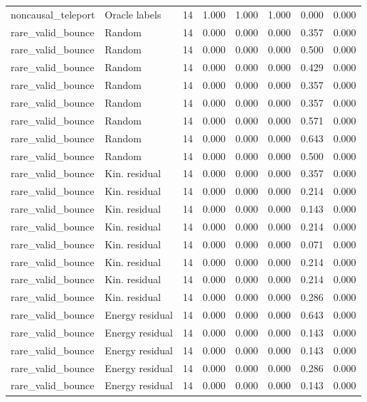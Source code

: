 {\begin{longtable}{llrrrrrr}
noncausal\_teleport & Oracle labels & 14 & 1.000 & 1.000 & 1.000 & 0.000 & 0.000 \\
rare\_valid\_bounce & Random & 14 & 0.000 & 0.000 & 0.000 & 0.357 & 0.000 \\
rare\_valid\_bounce & Random & 14 & 0.000 & 0.000 & 0.000 & 0.500 & 0.000 \\
rare\_valid\_bounce & Random & 14 & 0.000 & 0.000 & 0.000 & 0.429 & 0.000 \\
rare\_valid\_bounce & Random & 14 & 0.000 & 0.000 & 0.000 & 0.357 & 0.000 \\
rare\_valid\_bounce & Random & 14 & 0.000 & 0.000 & 0.000 & 0.357 & 0.000 \\
rare\_valid\_bounce & Random & 14 & 0.000 & 0.000 & 0.000 & 0.571 & 0.000 \\
rare\_valid\_bounce & Random & 14 & 0.000 & 0.000 & 0.000 & 0.643 & 0.000 \\
rare\_valid\_bounce & Random & 14 & 0.000 & 0.000 & 0.000 & 0.500 & 0.000 \\
rare\_valid\_bounce & Kin. residual & 14 & 0.000 & 0.000 & 0.000 & 0.357 & 0.000 \\
rare\_valid\_bounce & Kin. residual & 14 & 0.000 & 0.000 & 0.000 & 0.214 & 0.000 \\
rare\_valid\_bounce & Kin. residual & 14 & 0.000 & 0.000 & 0.000 & 0.143 & 0.000 \\
rare\_valid\_bounce & Kin. residual & 14 & 0.000 & 0.000 & 0.000 & 0.214 & 0.000 \\
rare\_valid\_bounce & Kin. residual & 14 & 0.000 & 0.000 & 0.000 & 0.071 & 0.000 \\
rare\_valid\_bounce & Kin. residual & 14 & 0.000 & 0.000 & 0.000 & 0.214 & 0.000 \\
rare\_valid\_bounce & Kin. residual & 14 & 0.000 & 0.000 & 0.000 & 0.214 & 0.000 \\
rare\_valid\_bounce & Kin. residual & 14 & 0.000 & 0.000 & 0.000 & 0.286 & 0.000 \\
rare\_valid\_bounce & Energy residual & 14 & 0.000 & 0.000 & 0.000 & 0.643 & 0.000 \\
rare\_valid\_bounce & Energy residual & 14 & 0.000 & 0.000 & 0.000 & 0.143 & 0.000 \\
rare\_valid\_bounce & Energy residual & 14 & 0.000 & 0.000 & 0.000 & 0.143 & 0.000 \\
rare\_valid\_bounce & Energy residual & 14 & 0.000 & 0.000 & 0.000 & 0.286 & 0.000 \\
rare\_valid\_bounce & Energy residual & 14 & 0.000 & 0.000 & 0.000 & 0.143 & 0.000 \\

\end{longtable}}
